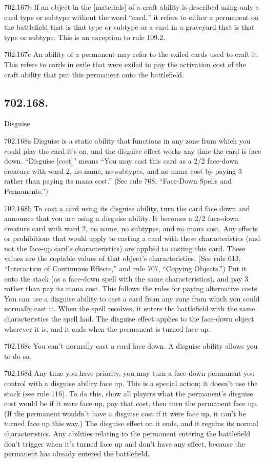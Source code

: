 702.167b If an object in the [materials] of a craft ability is described using only a card type or subtype without the word “card,” it refers to either a permanent on the battlefield that is that type or subtype or a card in a graveyard that is that type or subtype. This is an exception to rule 109.2.

702.167c An ability of a permanent may refer to the exiled cards used to craft it. This refers to cards in exile that were exiled to pay the activation cost of the craft ability that put this permanent onto the battlefield.

\subsection*{702.168.}
Disguise

702.168a Disguise is a static ability that functions in any zone from which you could play the card it’s on, and the disguise effect works any time the card is face down. “Disguise [cost]” means “You may cast this card as a 2/2 face-down creature with ward {2}, no name, no subtypes, and no mana cost by paying {3} rather than paying its mana cost.” (See rule 708, “Face-Down Spells and Permanents.”)

702.168b To cast a card using its disguise ability, turn the card face down and announce that you are using a disguise ability. It becomes a 2/2 face-down creature card with ward {2}, no name, no subtypes, and no mana cost. Any effects or prohibitions that would apply to casting a card with these characteristics (and not the face-up card’s characteristics) are applied to casting this card. These values are the copiable values of that object’s characteristics. (See rule 613, “Interaction of Continuous Effects,” and rule 707, “Copying Objects.”) Put it onto the stack (as a face-down spell with the same characteristics), and pay {3} rather than pay its mana cost. This follows the rules for paying alternative costs. You can use a disguise ability to cast a card from any zone from which you could normally cast it. When the spell resolves, it enters the battlefield with the same characteristics the spell had. The disguise effect applies to the face-down object wherever it is, and it ends when the permanent is turned face up.

702.168c You can’t normally cast a card face down. A disguise ability allows you to do so.

702.168d Any time you have priority, you may turn a face-down permanent you control with a disguise ability face up. This is a special action; it doesn’t use the stack (see rule 116). To do this, show all players what the permanent’s disguise cost would be if it were face up, pay that cost, then turn the permanent face up. (If the permanent wouldn’t have a disguise cost if it were face up, it can’t be turned face up this way.) The disguise effect on it ends, and it regains its normal characteristics. Any abilities relating to the permanent entering the battlefield don’t trigger when it’s turned face up and don’t have any effect, because the permanent has already entered the battlefield.

